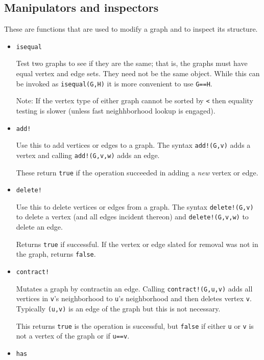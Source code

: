 \documentclass[oneside]{amsart}
\begin{document}
\subsection*{Manipulators and inspectors}

These are functions that are used to modify a graph and to inspect its
structure.

\begin{itemize}

\item \verb|isequal|

  Test two graphs to see if they are the same; that is, the graphs
  must have equal vertex and edge sets. They need not be the same
  object. While this can be invoked as \verb|isequal(G,H)| it is more
  convenient to use \verb|G==H|.

  Note: If the vertex type of either graph cannot be sorted by
  \verb|<| then equality testing is slower (unless fast neighhborhood
  lookup is engaged).

\item \verb|add!|

  Use this to add vertices or edges to a graph. The syntax
  \verb|add!(G,v)| adds a vertex and calling \verb|add!(G,v,w)| adds an edge.

  These return \verb|true| if the operation succeeded in adding a
  \emph{new} vertex or edge.

\item \verb|delete!|

  Use this to delete vertices or edges from a graph. The syntax
  \verb|delete!(G,v)| to delete a vertex (and all edges incident
  thereon) and \verb|delete!(G,v,w)| to delete an edge.

  Returns \verb|true| if successful. If the vertex or edge slated for
  removal was not in the graph, returns \verb|false|.

\item \verb|contract!|

  Mutates a graph by contractin an edge. Calling
  \verb|contract!(G,u,v)| adds all vertices in \verb|v|'s neighborhood
  to \verb|u|'s neighborhood and then deletes vertex
  \verb|v|. Typically \verb|(u,v)| is an edge of the graph but this is
  not necessary.

  This returns \verb|true| is the operation is successful, but
  \verb|false| if either \verb|u| or \verb|v| is not a vertex of the
  graph or if \verb|u==v|.


\item \verb|has|


\end{itemize}
\end{document}
